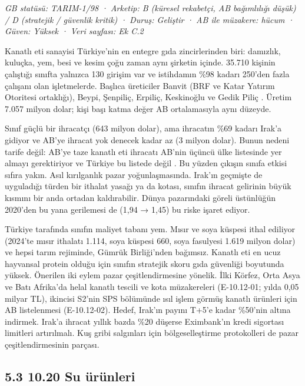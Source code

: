 \emph{GB statüsü: TARIM-1/98 · Arketip: B (küresel rekabetçi, AB bağımlılığı düşük) / D (stratejik / güvenlik kritik) · Duruş: Geliştir · AB ile müzakere: hücum · Güven: Yüksek · Veri sayfası: Ek C.2}

Kanatlı eti sanayisi Türkiye'nin en entegre gıda zincirlerinden biri: damızlık, kuluçka, yem, besi ve kesim çoğu zaman aynı şirketin içinde. 35.710 kişinin çalıştığı sınıfta yalnızca 130 girişim var ve istihdamın \%98 kadarı 250'den fazla çalışanı olan işletmelerde. Başlıca üreticiler Banvit (BRF ve Katar Yatırım Otoritesi ortaklığı), Beypi, Şenpiliç, Erpiliç, Keskinoğlu ve Gedik Piliç \etiketH{}. Üretim 7.057 milyon dolar; kişi başı katma değer AB ortalamasıyla aynı düzeyde.

Sınıf güçlü bir ihracatçı (643 milyon dolar), ama ihracatın \%69 kadarı Irak'a gidiyor ve AB'ye ihracat yok denecek kadar az (3 milyon dolar). Bunun nedeni tarife değil: AB'ye taze kanatlı eti ihracatı AB'nin üçüncü ülke listesinde yer almayı gerektiriyor ve Türkiye bu listede değil \etiketD{}. Bu yüzden çıkışın sınıfa etkisi sıfıra yakın. Asıl kırılganlık pazar yoğunlaşmasında. Irak'ın geçmişte de uyguladığı türden bir ithalat yasağı ya da kotası, sınıfın ihracat gelirinin büyük kısmını bir anda ortadan kaldırabilir. Dünya pazarındaki göreli üstünlüğün 2020'den bu yana gerilemesi de (1,94 → 1,45) bu riske işaret ediyor.

Türkiye tarafında sınıfın maliyet tabanı yem. Mısır ve soya küspesi ithal ediliyor (2024'te mısır ithalatı 1.114, soya küspesi 660, soya fasulyesi 1.619 milyon dolar) ve hepsi tarım rejiminde, Gümrük Birliği'nden bağımsız. Kanatlı eti en ucuz hayvansal protein olduğu için sınıfın stratejik skoru gıda güvenliği boyutunda yüksek. Önerilen iki eylem pazar çeşitlendirmesine yönelik. İlki Körfez, Orta Asya ve Batı Afrika'da helal kanatlı tescili ve kota müzakereleri (E-10.12-01; yılda 0,05 milyar TL), ikincisi S2'nin SPS bölümünde ısıl işlem görmüş kanatlı ürünleri için AB listelenmesi (E-10.12-02). Hedef, Irak'ın payını T+5'e kadar \%50'nin altına indirmek. Irak'a ihracat yıllık bazda \%20 düşerse Eximbank'ın kredi sigortası limitleri artırılmalı. Kuş gribi salgınları için bölgeselleştirme protokolleri de pazar çeşitlendirmesinin parçası.

\hypertarget{nace_kartlar_10-12-53-1020-su-uxfcruxfcnleri}{%
\subsection{5.3 10.20 Su ürünleri}\label{nace_kartlar_10-12-53-1020-su-uxfcruxfcnleri}}

